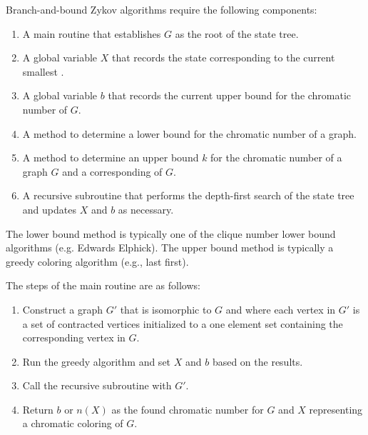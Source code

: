 Branch-and-bound Zykov algorithms require the following components:
\begin{enumerate}
\item A main routine that establishes \(G\) as the root of the state tree.
\item A global variable \(X\) that records the state corresponding to the current smallest .
\item A global variable \(b\) that records the current upper bound for the chromatic number of \(G\).
\item A method to determine a lower bound for the chromatic number of a graph.
\item A method to determine an upper bound \(k\) for the chromatic number of a graph \(G\) and a corresponding
   of \(G\).
\item A recursive subroutine that performs the depth-first search of the state tree and updates \(X\) and \(b\) as
  necessary.
\end{enumerate}

The lower bound method is typically one of the clique number lower bound algorithms (e.g. Edwards Elphick).  The
upper bound method is typically a greedy coloring algorithm (e.g., last first).

The steps of the main routine are as follows:
\begin{enumerate}
\item Construct a graph \(G'\) that is isomorphic to \(G\) and where each vertex in \(G'\) is a set of contracted
  vertices initialized to a one element set containing the corresponding vertex in \(G\).
\item Run the greedy algorithm and set \(X\) and \(b\) based on the results.
\item Call the recursive subroutine with \(G'\).
\item Return \(b\) or \(n(X)\) as the found chromatic number for \(G\) and \(X\) representing a chromatic coloring
  of \(G\).
\end{enumerate}

